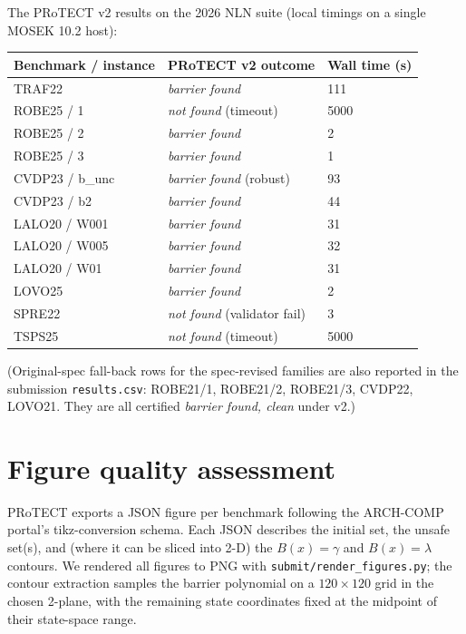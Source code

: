 \documentclass[11pt,a4paper]{article}
\begin{document}
The PRoTECT v2 results on the 2026 NLN suite (local timings on a
single MOSEK 10.2 host):
\begin{center}
\begin{tabular}{lll}
\hline
Benchmark / instance & PRoTECT v2 outcome & Wall time (s) \\
\hline
TRAF22                & \emph{barrier found}             & 111 \\
ROBE25 / 1            & \emph{not found} (timeout)       & 5000 \\
ROBE25 / 2            & \emph{barrier found}             & 2 \\
ROBE25 / 3            & \emph{barrier found}             & 1 \\
CVDP23 / b\_unc       & \emph{barrier found} (robust)    & 93 \\
CVDP23 / b2           & \emph{barrier found}             & 44 \\
LALO20 / W001         & \emph{barrier found}             & 31 \\
LALO20 / W005         & \emph{barrier found}             & 32 \\
LALO20 / W01          & \emph{barrier found}             & 31 \\
LOVO25                & \emph{barrier found}             & 2 \\
SPRE22                & \emph{not found} (validator fail) & 3 \\
TSPS25                & \emph{not found} (timeout)       & 5000 \\
\hline
\end{tabular}
\end{center}

\noindent (Original-spec fall-back rows for the spec-revised families
are also reported in the submission \texttt{results.csv}: ROBE21/1,
ROBE21/2, ROBE21/3, CVDP22, LOVO21. They are all certified
\emph{barrier found, clean} under v2.)

\section*{Figure quality assessment}

PRoTECT exports a JSON figure per benchmark following the ARCH-COMP
portal's tikz-conversion schema. Each JSON describes the initial set,
the unsafe set(s), and (where it can be sliced into 2-D) the
$B(x) = \gamma$ and $B(x) = \lambda$ contours. We rendered all figures
to PNG with \texttt{submit/render\_figures.py}; the contour extraction
samples the barrier polynomial on a $120\times 120$ grid in the
chosen 2-plane, with the remaining state coordinates fixed at the
midpoint of their state-space range.
\end{document}
